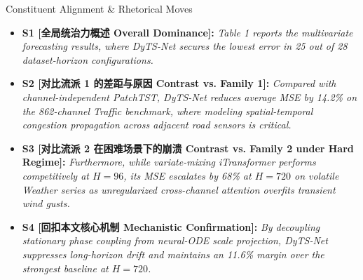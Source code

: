 \begin{TipBox}{Constituent Alignment \& Rhetorical Moves}
\begin{itemize}[leftmargin=1.5em]
  \item \textbf{S1 [全局统治力概述 Overall Dominance]:} \textit{Table 1 reports the multivariate forecasting results, where DyTS-Net secures the lowest error in 25 out of 28 dataset-horizon configurations.}\par{}
  \item \textbf{S2 [对比流派 1 的差距与原因 Contrast vs. Family 1]:} \textit{Compared with channel-independent PatchTST, DyTS-Net reduces average MSE by 14.2\% on the 862-channel Traffic benchmark, where modeling spatial-temporal congestion propagation across adjacent road sensors is critical.}\par{}
  \item \textbf{S3 [对比流派 2 在困难场景下的崩溃 Contrast vs. Family 2 under Hard Regime]:} \textit{Furthermore, while variate-mixing iTransformer performs competitively at $H=96$, its MSE escalates by 68\% at $H=720$ on volatile Weather series as unregularized cross-channel attention overfits transient wind gusts.}\par{}
  \item \textbf{S4 [回扣本文核心机制 Mechanistic Confirmation]:} \textit{By decoupling stationary phase coupling from neural-ODE scale projection, DyTS-Net suppresses long-horizon drift and maintains an 11.6\% margin over the strongest baseline at $H=720$.}\par{}
\end{itemize}
\end{TipBox}
\bigskip
